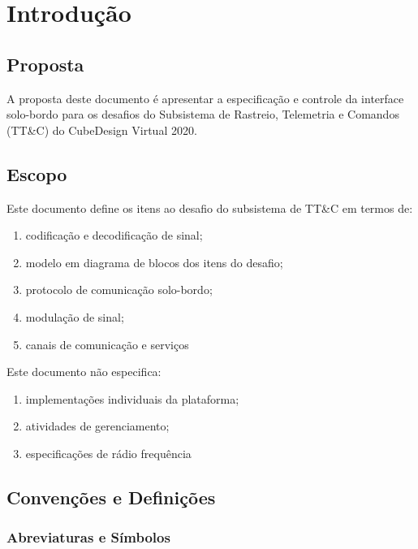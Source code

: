 \section{Introdução}

\subsection{Proposta}

A proposta deste documento é apresentar a especificação e controle da interface solo-bordo para os desafios do Subsistema de Rastreio, Telemetria e Comandos (TT\&C) do CubeDesign Virtual 2020.

\subsection{Escopo}

Este documento define os itens ao desafio do subsistema de TT\&C em termos de:

\begin{enumerate}[label=\alph*.]
    \item codificação e decodificação de sinal;
    \item modelo em diagrama de blocos dos itens do desafio;
    \item protocolo de comunicação solo-bordo;
    \item modulação de sinal;
    \item canais de comunicação e serviços
\end{enumerate}

Este documento não especifica:

\begin{enumerate}[label=\alph*.]
    \item implementações individuais da plataforma;
    \item atividades de gerenciamento;
    \item especificações de rádio frequência
\end{enumerate}

\subsection{Convenções e Definições}

\subsubsection{Abreviaturas e Símbolos}


